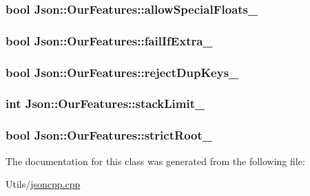 \hypertarget{classJson_1_1OurFeatures_af760f91cc2a7af37e44f78fb466061bb}{
\subsubsection[{allow\-Special\-Floats\-\_\-}]{\setlength{\rightskip}{0pt plus 5cm}bool Json\-::\-Our\-Features\-::allow\-Special\-Floats\-\_\-}}\label{classJson_1_1OurFeatures_af760f91cc2a7af37e44f78fb466061bb}
\hypertarget{classJson_1_1OurFeatures_ae8ad25b90706c78f1a8fe929191ac61b}{
\subsubsection[{fail\-If\-Extra\-\_\-}]{\setlength{\rightskip}{0pt plus 5cm}bool Json\-::\-Our\-Features\-::fail\-If\-Extra\-\_\-}}\label{classJson_1_1OurFeatures_ae8ad25b90706c78f1a8fe929191ac61b}
\hypertarget{classJson_1_1OurFeatures_a39b8e0b86b1c24a45e800c023bb715aa}{
\subsubsection[{reject\-Dup\-Keys\-\_\-}]{\setlength{\rightskip}{0pt plus 5cm}bool Json\-::\-Our\-Features\-::reject\-Dup\-Keys\-\_\-}}\label{classJson_1_1OurFeatures_a39b8e0b86b1c24a45e800c023bb715aa}
\hypertarget{classJson_1_1OurFeatures_a9a786713902d14be6d57a08cc03ccfff}{
\subsubsection[{stack\-Limit\-\_\-}]{\setlength{\rightskip}{0pt plus 5cm}int Json\-::\-Our\-Features\-::stack\-Limit\-\_\-}}\label{classJson_1_1OurFeatures_a9a786713902d14be6d57a08cc03ccfff}
\hypertarget{classJson_1_1OurFeatures_a2095f66a776c0a4ae6cc931a0c94242e}{
\subsubsection[{strict\-Root\-\_\-}]{\setlength{\rightskip}{0pt plus 5cm}bool Json\-::\-Our\-Features\-::strict\-Root\-\_\-}}\label{classJson_1_1OurFeatures_a2095f66a776c0a4ae6cc931a0c94242e}


The documentation for this class was generated from the following file\-:\begin{DoxyCompactItemize}
\item 
Utils/\hyperlink{jsoncpp_8cpp}{jsoncpp.\-cpp}\end{DoxyCompactItemize}
